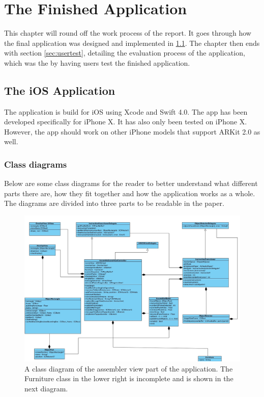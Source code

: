 \chapter{The Finished Application}
This chapter will round off the work process of the report. It goes through how the final application was designed and implemented in \ref{sec:Application}. The chapter then ends with section \ref{sec:usertest}, detailing the evaluation process of the application, which was the by having users test the finished application.

\section{The iOS Application}
\label{sec:Application}
The application is build for iOS using Xcode and Swift 4.0. The app has been developed specifically for iPhone X. It has also only been tested on iPhone X. However, the app should work on other iPhone models that support ARKit 2.0 as well.

\subsection{Class diagrams}
Below are some class diagrams for the reader to better understand what different parts there are, 
how they fit together and how the application works as a whole. The diagrams are divided into 
three parts to be readable in the paper.

\begin{figure}[!hbtp]
\begin{center}
\includegraphics[width = 1.1\textwidth]{./Images/AssemblerClassDiagram1.jpg}
\caption{A class diagram of the assembler view part of the application. The Furniture class in the lower right is incomplete and is shown in the next diagram.}
\label{fig:classdiagramassembler}
\end{center}
\end{figure}

